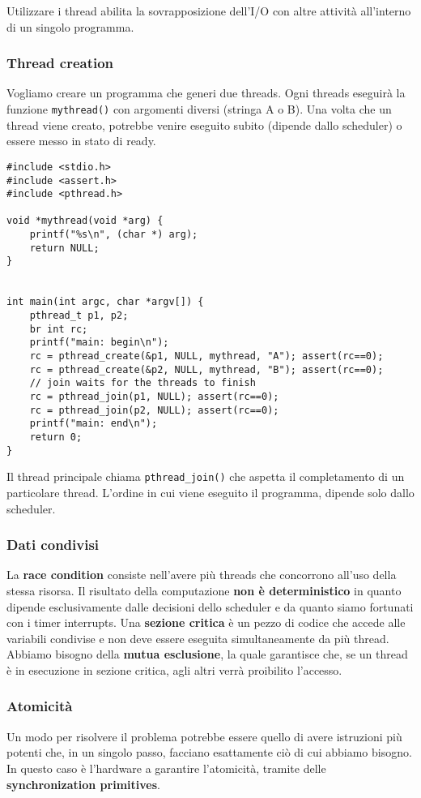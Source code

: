 \documentclass[12pt, letterpaper]{article}
\begin{document}
			Utilizzare i thread abilita la sovrapposizione dell'I/O con altre attività all'interno di un singolo programma.
			
			\subsubsection{Thread creation}
				Vogliamo creare un programma che generi due threads. Ogni threads eseguirà la funzione \texttt{mythread()} con argomenti diversi (stringa A o B). Una volta che un thread viene creato, potrebbe venire eseguito subito (dipende dallo scheduler) o essere messo in stato di ready. 
				\begin{lstlisting}[style=CStyle]
#include <stdio.h>
#include <assert.h>
#include <pthread.h>

void *mythread(void *arg) {
	printf("%s\n", (char *) arg);
	return NULL;
}


int main(int argc, char *argv[]) {
	pthread_t p1, p2;
	br int rc;
	printf("main: begin\n");
	rc = pthread_create(&p1, NULL, mythread, "A"); assert(rc==0);
	rc = pthread_create(&p2, NULL, mythread, "B"); assert(rc==0);
	// join waits for the threads to finish
	rc = pthread_join(p1, NULL); assert(rc==0);
	rc = pthread_join(p2, NULL); assert(rc==0);
	printf("main: end\n");
	return 0;
} 				\end{lstlisting}
				Il thread principale chiama \texttt{pthread\_join()} che aspetta il completamento di un particolare thread. L'ordine in cui viene eseguito il programma, dipende solo dallo scheduler.
			
			\subsubsection{Dati condivisi}
				La \textbf{race condition} consiste nell'avere più threads che concorrono all'uso della stessa risorsa. Il risultato della computazione \textbf{non è deterministico} in quanto dipende esclusivamente dalle decisioni dello scheduler e da quanto siamo fortunati con i timer interrupts. Una \textbf{sezione critica} è un pezzo di codice che accede alle variabili condivise e non deve essere eseguita simultaneamente da più thread. Abbiamo bisogno della \textbf{mutua esclusione}, la quale garantisce che, se un thread è in esecuzione in sezione critica, agli altri verrà proibilito l'accesso.
				
			\subsubsection{Atomicità}
				Un modo per risolvere il problema potrebbe essere quello di avere istruzioni più potenti che, in un singolo passo, facciano esattamente ciò di cui abbiamo bisogno. In questo caso è l'hardware a garantire l'atomicità, tramite delle \textbf{synchronization primitives}. 
			
\end{document}
